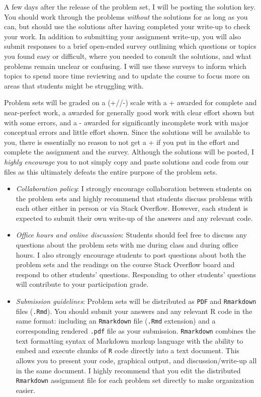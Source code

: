 \documentclass[11pt, article, oneside]{memoir}
\theoremstyle{Assumption}
\begin{document}
\begin{itemize}
A few days after the release of the problem set, I will be posting the solution key. You should work through the problems \textit{without} the solutions for as long as you can, but should use the solutions after having completed your write-up to check your work. In addition to submitting your assignment write-up, you will also submit responses to a brief open-ended survey outlining which questions or topics you found easy or difficult, where you needed to consult the solutions, and what problems remain unclear or confusing. I will use these surveys to inform which topics to spend more time reviewing and to update the course to focus more on areas that students might be struggling with. 

Problem sets will be graded on a (+/\checkmark/-) scale with a + awarded for complete and near-perfect work, a \checkmark awarded for generally good work with clear effort shown but with some errors, and a - awarded for significantly incomplete work with major conceptual errors and little effort shown. Since the solutions will be available to you, there is essentially no reason to not get a + if you put in the effort and complete the assignment and the survey. Although the solutions will be posted, I \textit{highly encourage} you to not simply copy and paste solutions and code from our files as this ultimately defeats the entire purpose of the problem sets.
 
\begin{itemize}
       \item \textit{Collaboration policy}: I strongly encourage collaboration between students on the problem sets and highly recommend that students discuss problems with each other either in person or via Stack Overflow. However, each student is expected to submit their own write-up of the answers and any relevant code. 
        \item \textit{Office hours and online discussion}: Students should feel free to discuss any questions about the problem sets with me during class and during office hours. I also strongly encourage students to post questions about both the problem sets and the readings on the course Stack Overflow board and respond to other students’ questions. Responding to other students’ questions will contribute to your participation grade.
        \item \textit{Submission guidelines}: Problem sets will be distributed as \texttt{PDF} and \texttt{Rmarkdown} files (\texttt{.Rmd}). You should submit your answers and any relevant R code in the same format: including an \texttt{Rmarkdown} file (\texttt{.Rmd} extension) and a corresponding rendered \texttt{.pdf} file as your submission. \texttt{Rmarkdown} combines the text formatting syntax of Markdown markup language with the ability to embed and execute chunks of \texttt{R} code directly into a text document. This allows you to present your code, graphical output, and discussion/write-up all in the same document. I highly recommend that you edit the distributed \texttt{Rmarkdown} assignment file for each problem set directly to make organization easier.
        \end{itemize}


\end{itemize}
\end{document}
